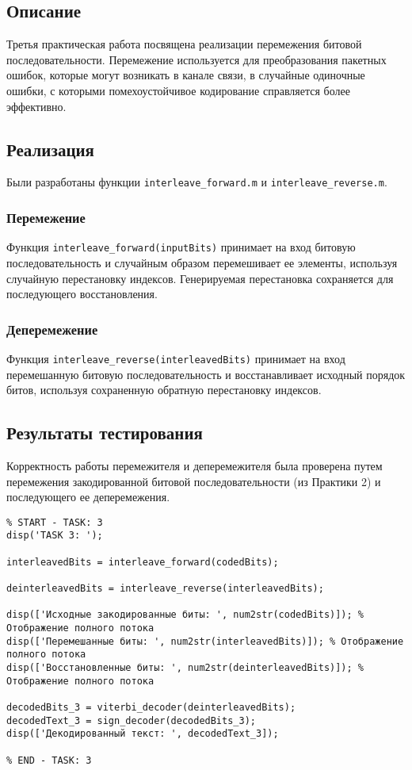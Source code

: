 \subsection{Описание}
Третья практическая работа посвящена реализации перемежения битовой последовательности. Перемежение используется для преобразования пакетных ошибок, которые могут возникать в канале связи, в случайные одиночные ошибки, с которыми помехоустойчивое кодирование справляется более эффективно.

\subsection{Реализация}
Были разработаны функции \texttt{interleave\_forward.m} и \texttt{interleave\_reverse.m}.
\subsubsection{Перемежение}
Функция \texttt{interleave\_forward(inputBits)} принимает на вход битовую последовательность и случайным образом перемешивает ее элементы, используя случайную перестановку индексов. Генерируемая перестановка сохраняется для последующего восстановления.

\subsubsection{Деперемежение}
Функция \texttt{interleave\_reverse(interleavedBits)} принимает на вход перемешанную битовую последовательность и восстанавливает исходный порядок битов, используя сохраненную обратную перестановку индексов.

\subsection{Результаты тестирования}
Корректность работы перемежителя и деперемежителя была проверена путем перемежения закодированной битовой последовательности (из Практики 2) и последующего ее деперемежения.

\begin{verbatim}
% START - TASK: 3
disp('TASK 3: ');

interleavedBits = interleave_forward(codedBits);

deinterleavedBits = interleave_reverse(interleavedBits);

disp(['Исходные закодированные биты: ', num2str(codedBits)]); % Отображение полного потока
disp(['Перемешанные биты: ', num2str(interleavedBits)]); % Отображение полного потока
disp(['Восстановленные биты: ', num2str(deinterleavedBits)]); % Отображение полного потока

decodedBits_3 = viterbi_decoder(deinterleavedBits);
decodedText_3 = sign_decoder(decodedBits_3);
disp(['Декодированный текст: ', decodedText_3]);

% END - TASK: 3
\end{verbatim}

